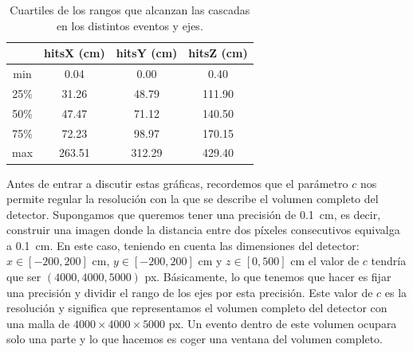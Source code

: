 \documentclass[a4paper,12pt,oneside,titlepage]{book}
\begin{document}
\begin{table}[h!]
  \centering
  \begin{tabular}{|c|c|c|c|}
  \hline
           &  hitsX (\si{\cm}) &  hitsY (\si{\cm}) &  hitsZ (\si{cm}) \\ \hline
  min      &        0.04 &        0.00 &        0.40 \\ \hline
  25\%     &       31.26 &       48.79 &      111.90 \\ \hline
  50\%     &       47.47 &       71.12 &      140.50 \\ \hline
  75\%     &       72.23 &       98.97 &      170.15 \\ \hline
  max      &      263.51 &      312.29 &      429.40 \\ \hline
\end{tabular}
\caption{Cuartiles de los rangos que alcanzan las cascadas en los distintos eventos y ejes.}
\label{tab:cuartiles_rango}
\end{table}

Antes de entrar a discutir estas gráficas, recordemos que el parámetro $c$ nos permite regular la resolución con la que se describe el volumen completo del detector. Supongamos que queremos tener una precisión de \SI{0.1}{\cm}, es decir, construir una imagen donde la distancia entre dos píxeles consecutivos equivalga a \SI{0.1}{\cm}. En este caso, teniendo en cuenta las dimensiones del detector: $x \in [-200, 200]$ \si{\cm}, $y \in [-200, 200]$ \si{\cm} y $z \in [0, 500]$ \si{\cm} el valor de $c$ tendría que ser $(4000, 4000, 5000)$ \si{px}. Básicamente, lo que tenemos que hacer es fijar una precisión y dividir el rango de los ejes por esta precisión. Este valor de $c$ es la resolución y significa que representamos el volumen completo del detector con una malla de $4000\times 4000\times 5000$ \si{px}. Un evento dentro de este volumen ocupara solo una parte y lo que hacemos es coger una ventana del volumen completo.
\end{document}

